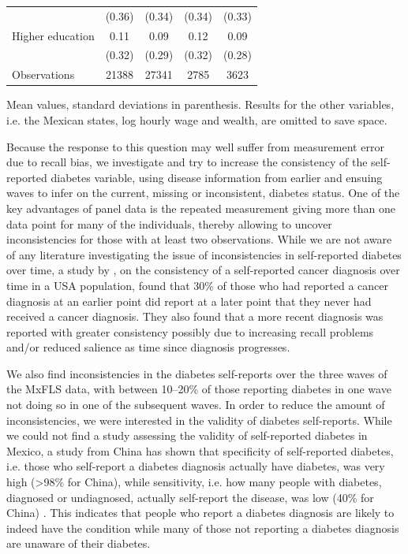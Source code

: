 \begin{table}
\begin{adjustbox}{max width=0.9\textwidth, center}
\begin{threeparttable}
{\begin{tabular}{l*{4}{c}}
                    &      (0.36)&      (0.34)&      (0.34)&      (0.33)\\
Higher education    &        0.11&        0.09&        0.12&        0.09\\
                    &      (0.32)&      (0.29)&      (0.32)&      (0.28)\\
\midrule
Observations        &    21388&       27341&        2785&        3623\\
\bottomrule
\end{tabular}
\begin{tablenotes}
\item Mean values, standard deviations in parenthesis. Results for the other variables, i.e. the Mexican states, log hourly wage and wealth, are omitted to save space.
\end{tablenotes}
}
\end{threeparttable}
\end{adjustbox}
\end{table}


Because the response to this question may well suffer from measurement error due to recall bias, we investigate and try to increase the consistency of the self-reported diabetes variable, using disease information from earlier and ensuing waves to infer on the current, missing or inconsistent, diabetes status. One of the key advantages of panel data is the repeated measurement giving more than one data point for many of the individuals, thereby allowing to uncover inconsistencies for those with at least two observations. While we are not aware of any literature investigating the issue of inconsistencies in self-reported diabetes over time, a study by \textcite{Zajacova2010}, on the consistency of a self-reported cancer diagnosis over time in a USA population, found that 30\% of those who had reported a cancer diagnosis at an earlier point did report at a later point that they never had received a cancer diagnosis. They also found that a more recent diagnosis was reported with greater consistency possibly due to increasing recall problems and/or reduced salience as time since diagnosis progresses.

We also find inconsistencies in the diabetes self-reports over the three waves of the \ac{MxFLS} data, with between 10--20\% of those reporting diabetes in one wave not doing so in one of the subsequent waves. In order to reduce the amount of inconsistencies, we were interested in the validity of diabetes self-reports. While we could not find a study assessing the validity of self-reported diabetes in Mexico, a study from China has shown that specificity of self-reported diabetes, i.e. those who self-report a diabetes diagnosis actually have diabetes, was very high (>98\% for China), while sensitivity, i.e. how many people with diabetes, diagnosed or undiagnosed, actually self-report the disease, was low (40\% for China) \parencite{Yuan2015}. This indicates that people who report a diabetes diagnosis are likely to indeed have the condition while many of those not reporting a diabetes diagnosis are unaware of their diabetes.

